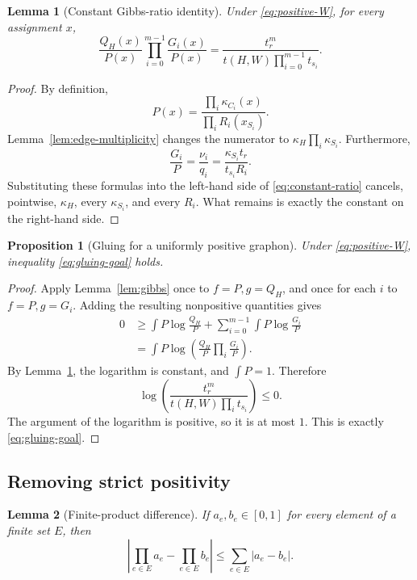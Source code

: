 \documentclass[11pt]{article}
\newtheorem{lemma}{Lemma}
\newtheorem{proposition}{Proposition}
\begin{document}
\begin{lemma}[Constant Gibbs-ratio identity]\label{lem:constant-ratio}
Under \eqref{eq:positive-W}, for every assignment \(x\),
\begin{equation}\label{eq:constant-ratio}
    \frac{Q_H(x)}{P(x)}
    \prod_{i=0}^{m-1}\frac{G_i(x)}{P(x)}
    =
    \frac{t_r^m}
    {t(H,W)\prod_{i=0}^{m-1}t_{s_i}}.
\end{equation}
\end{lemma}

\begin{proof}
By definition,
\[
    P(x)=\frac{\prod_i\kappa_{C_i}(x)}{\prod_iR_i(x_{S_i})}.
\]
Lemma~\ref{lem:edge-multiplicity} changes the numerator to
\(\kappa_H\prod_i\kappa_{S_i}\).  Furthermore,
\[
    \frac{G_i}{P}
    =
    \frac{\nu_i}{q_i}
    =
    \frac{\kappa_{S_i}t_r}{t_{s_i}R_i}.
\]
Substituting these formulas into the left-hand side of
\eqref{eq:constant-ratio} cancels, pointwise, \(\kappa_H\), every
\(\kappa_{S_i}\), and every \(R_i\).  What remains is exactly the constant
on the right-hand side.
\end{proof}

\begin{proposition}[Gluing for a uniformly positive graphon]
Under \eqref{eq:positive-W}, inequality \eqref{eq:gluing-goal} holds.
\end{proposition}

\begin{proof}
Apply Lemma~\ref{lem:gibbs} once to \(f=P,g=Q_H\), and once for each \(i\)
to \(f=P,g=G_i\).  Adding the resulting nonpositive quantities gives
\[
\begin{aligned}
    0
    &\ge
    \int P\log\frac{Q_H}{P}
    +
    \sum_{i=0}^{m-1}\int P\log\frac{G_i}{P}\\
    &=
    \int P\log\left(
      \frac{Q_H}{P}\prod_i\frac{G_i}{P}
    \right).
\end{aligned}
\]
By Lemma~\ref{lem:constant-ratio}, the logarithm is constant, and
\(\int P=1\).  Therefore
\[
    \log\left(
      \frac{t_r^m}{t(H,W)\prod_i t_{s_i}}
    \right)
    \le0.
\]
The argument of the logarithm is positive, so it is at most \(1\).  This is
exactly \eqref{eq:gluing-goal}.
\end{proof}

\subsection{Removing strict positivity}

\begin{lemma}[Finite-product difference]\label{lem:product-difference}
If \(a_e,b_e\in[0,1]\) for every element of a finite set \(E\), then
\[
    \left|\prod_{e\in E}a_e-\prod_{e\in E}b_e\right|
    \le
    \sum_{e\in E}|a_e-b_e|.
\]
\end{lemma}
\end{document}
